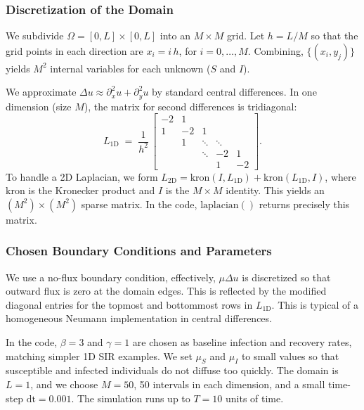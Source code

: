 \subsubsection{Discretization of the Domain}

We subdivide \(\Omega=[0,L]\times [0,L]\) into an \(\!M\times M\) grid. Let \(h=L/M\) so that the grid points in
each direction are \(x_i = i\,h\), for \(i=0,\dots,M\). Combining,
\(\bigl\{(x_i, y_j)\bigr\}\) yields \(M^2\) internal variables for each unknown (\(S\) and \(I\)).

We approximate \(\Delta u\approx \partial_x^2u+\partial_y^2u\) by standard central differences. In one dimension 
(size \(M\)), the matrix for second differences is tridiagonal:
\[
  L_{\text{1D}} \;=\; \frac{1}{h^2}\,\begin{bmatrix}
    -2 & 1 &         &   &     \\
     1 & -2 & 1      &   &     \\
       & 1  & \ddots & \ddots &\\
       &    & \ddots & -2 & 1   \\
       &    &        & 1 & -2
  \end{bmatrix}.
\]
To handle a 2D Laplacian, we form \(L_{\text{2D}} = \text{kron}(I,L_{\text{1D}}) + \text{kron}(L_{\text{1D}},I)\), 
where \(\text{kron}\) is the Kronecker product and \(I\) is the \(M\times M\) identity. This yields an 
\((M^2)\times(M^2)\) sparse matrix. In the code, \(\mathrm{laplacian()}\) returns precisely this matrix.

\subsubsection{Chosen Boundary Conditions and Parameters}

We use a no-flux boundary condition, effectively, \(\mu \Delta u\) is discretized so that outward flux is zero 
at the domain edges. This is reflected by the modified diagonal entries for the topmost and bottommost rows 
in \(L_{\text{1D}}\). This is typical of a homogeneous Neumann implementation in central differences.


In the code, \(\beta=3\) and \(\gamma=1\) are chosen as baseline infection and recovery rates, matching simpler 
1D SIR examples.  We set \(\mu_S\) and \(\mu_I\) to small values so that susceptible and infected individuals do 
not diffuse too quickly.  The domain is \(L=1\), and we choose \(M=50\), 50 intervals in each dimension, and a 
small time-step \(\text{dt} = 0.001\).  The simulation runs up to \(T=10\) units of time.


